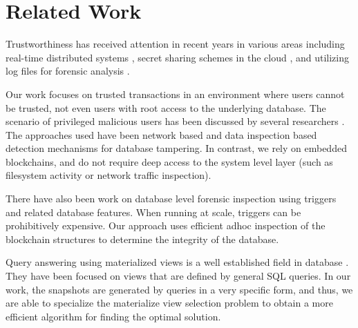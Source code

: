 \section{Related Work}

Trustworthiness has received attention in recent years in various areas
including real-time distributed systems \cite{khayat2017trust}, secret
sharing schemes in the cloud \cite{dutta2013privacy}, and utilizing log files
for forensic analysis \cite{sinha2014continuous}.  

Our work focuses on trusted
transactions in an environment where users cannot be trusted, not even users
with root access to the underlying database. The scenario of privileged
malicious users has been discussed by several researchers
\cite{crosby2009tamper-evident,wagner2018detect,wanger2017carving}. The
approaches
used have been network based and data inspection based detection mechanisms for
database tampering.  In contrast, we rely on embedded blockchains, and do not
require deep access to the system level layer (such as filesystem activity or
network traffic inspection).

There have also been work on database level forensic inspection
\cite{fabbri2013select,hauger2014information} using triggers and related database
features.  When running at scale, triggers can be prohibitively expensive.  Our
approach uses efficient adhoc inspection of the blockchain structures
to determine the integrity of the database.

Query answering using materialized views is a well established field in database
\cite{du2017deepsea,sohrabi2016materialized,shukla1998materialized,aouiche2006clustering}.
They have been focused on views that are defined by general SQL queries.  In our
work, the snapshots are generated by queries in a very specific form, and thus, we
are able to specialize the materialize view selection problem to obtain a
more efficient algorithm for finding the optimal solution.
